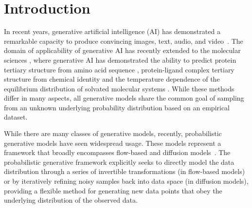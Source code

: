 
\section{Introduction}

In recent years, generative artificial intelligence (AI) has demonstrated a remarkable capacity to produce convincing images, text, audio, and video~\cite{latent-diffusion,chatgpt,video-diffusion}. The domain of applicability of generative AI has recently extended to the molecular sciences \cite{tiwary2024generative}, where generative AI has demonstrated the ability to predict protein tertiary structure from amino acid sequence \cite{distributional-graphormer,alphafold-2,alphafold-3,RF-AA}, protein-ligand complex tertiary structure from chemical identity \cite{qiao2024neuralplexer, diffdock} and the temperature dependence of the equilibrium distribution of solvated molecular systems \cite{Noe2019Boltzmann, ddpm-remd, herron2024inferring}. While these methods differ in many aspects, all generative models share the common goal of sampling from an unknown underlying probability distribution based on an empirical dataset.

While there are many classes of generative models, recently, probabilistic generative models have seen widespread usage. These models represent a framework that broadly encompasses flow-based \cite{Dinh2017RealNVP,CFM-ot} and diffusion models~\cite{Song2021ScoreBased}. The probabilistic generative framework explicitly seeks to directly model the data distribution through a series of invertible transformations (in flow-based models) or by iteratively refining noisy samples back into data space (in diffusion models), providing a flexible method for generating new data points that obey the underlying distribution of the observed data.

